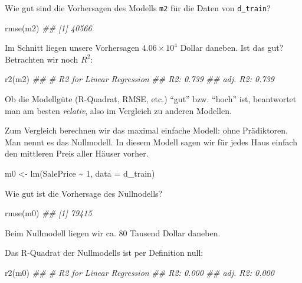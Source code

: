 \documentclass[
  letterpaper,
  twoside,
  open=any]{scrbook}
\newenvironment{Shaded}{\begin{snugshade}}{\end{snugshade}}
\newcommand{\AttributeTok}[1]{\textcolor[rgb]{0.40,0.45,0.13}{#1}}
\newcommand{\DecValTok}[1]{\textcolor[rgb]{0.68,0.00,0.00}{#1}}
\newcommand{\DocumentationTok}[1]{\textcolor[rgb]{0.37,0.37,0.37}{\textit{#1}}}
\newcommand{\FunctionTok}[1]{\textcolor[rgb]{0.28,0.35,0.67}{#1}}
\newcommand{\NormalTok}[1]{\textcolor[rgb]{0.00,0.23,0.31}{#1}}
\newcommand{\OtherTok}[1]{\textcolor[rgb]{0.00,0.23,0.31}{#1}}
\newcommand{\SpecialCharTok}[1]{\textcolor[rgb]{0.37,0.37,0.37}{#1}}
\theoremstyle{definition}
\theoremstyle{definition}
\theoremstyle{definition}
\theoremstyle{remark}
\begin{document}
Wie gut sind die Vorhersagen des Modells \texttt{m2} für die Daten von
\texttt{d\_train}?

\begin{Shaded}
\begin{Highlighting}[]
\FunctionTok{rmse}\NormalTok{(m2)}
\DocumentationTok{\#\# [1] 40566}
\end{Highlighting}
\end{Shaded}

Im Schnitt liegen unsere Vorhersagen \ensuremath{4.06\times 10^{4}}
Dollar daneben. Ist das gut? Betrachten wir noch \(R^2\):

\begin{Shaded}
\begin{Highlighting}[]
\FunctionTok{r2}\NormalTok{(m2)}
\DocumentationTok{\#\# \# R2 for Linear Regression}
\DocumentationTok{\#\#        R2: 0.739}
\DocumentationTok{\#\#   adj. R2: 0.739}
\end{Highlighting}
\end{Shaded}

Ob die Modellgüte (R-Quadrat, RMSE, etc.) \enquote{gut} bzw.
\enquote{hoch} ist, beantwortet man am besten \emph{relativ}, also im
Vergleich zu anderen Modellen.

Zum Vergleich berechnen wir das maximal einfache Modell: ohne
Prädiktoren. Man nennt es das Nullmodell. In diesem Modell sagen wir für
jedes Haus einfach den mittleren Preis aller Häuser vorher.

\begin{Shaded}
\begin{Highlighting}[]
\NormalTok{m0 }\OtherTok{\textless{}{-}} \FunctionTok{lm}\NormalTok{(SalePrice }\SpecialCharTok{\textasciitilde{}} \DecValTok{1}\NormalTok{, }\AttributeTok{data =}\NormalTok{ d\_train)}
\end{Highlighting}
\end{Shaded}

Wie gut ist die Vorhersage des Nullnodells?

\begin{Shaded}
\begin{Highlighting}[]
\FunctionTok{rmse}\NormalTok{(m0)}
\DocumentationTok{\#\# [1] 79415}
\end{Highlighting}
\end{Shaded}

Beim Nullmodell liegen wir ca. 80 Tausend Dollar daneben.

Das R-Quadrat der Nullmodells ist per Definition null:

\begin{Shaded}
\begin{Highlighting}[]
\FunctionTok{r2}\NormalTok{(m0)}
\DocumentationTok{\#\# \# R2 for Linear Regression}
\DocumentationTok{\#\#        R2: 0.000}
\DocumentationTok{\#\#   adj. R2: 0.000}
\end{Highlighting}
\end{Shaded}
\end{document}
